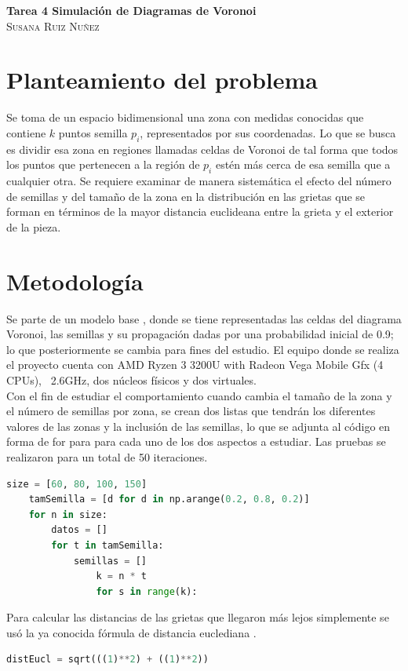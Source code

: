 \documentclass{article}
\begin{document}
	\begin{center}
	\huge{\textbf{Tarea 4 Simulación de Diagramas de Voronoi}}\\
	
	\textsc{ \Large Susana Ruiz Nuñez}
	\end{center}


\section{Planteamiento del problema} 
Se toma de un espacio bidimensional \cite{satu} una zona con medidas conocidas que contiene $k$ puntos semilla $p_i$, representados por sus coordenadas. Lo que se busca es dividir esa zona en regiones llamadas celdas de Voronoi de tal forma que todos los puntos que pertenecen a la región de $p_i$ estén más cerca de esa semilla que a cualquier otra. Se requiere examinar de manera sistemática el efecto del número de semillas y del tamaño de la zona en la distribución en las grietas que se forman en términos de la mayor distancia euclideana entre la grieta y el exterior de la pieza.


\section{Metodología}
Se parte de un modelo base \cite{satu}, donde se tiene representadas las celdas del diagrama Voronoi, las semillas y su propagación dadas por una probabilidad inicial de 0.9; lo que posteriormente se cambia para fines del estudio. El equipo donde se realiza el proyecto cuenta con AMD Ryzen 3 3200U with Radeon Vega Mobile Gfx   (4 CPUs), ~2.6GHz, dos núcleos físicos y dos virtuales.\\
Con el fin de estudiar el comportamiento cuando cambia el tamaño de la zona y el número de semillas por zona, se crean dos listas que tendrán los diferentes valores de las zonas y la inclusión de las semillas, lo que se adjunta al código en forma de for para para cada uno de los dos aspectos a estudiar. Las pruebas se realizaron para un total de 50 iteraciones.
  

\begin{lstlisting}[language=Python]
	size = [60, 80, 100, 150]
	tamSemilla = [d for d in np.arange(0.2, 0.8, 0.2)]
	for n in size:
		datos = []
		for t in tamSemilla:
			semillas = []
				k = n * t
				for s in range(k):
\end{lstlisting}

Para calcular las distancias de las grietas que llegaron más lejos simplemente se usó la ya conocida fórmula de distancia euclediana \cite{satu2}.
\begin{lstlisting}[language=Python]
	distEucl = sqrt(((1)**2) + ((1)**2))
\end{lstlisting}
\end{document}
